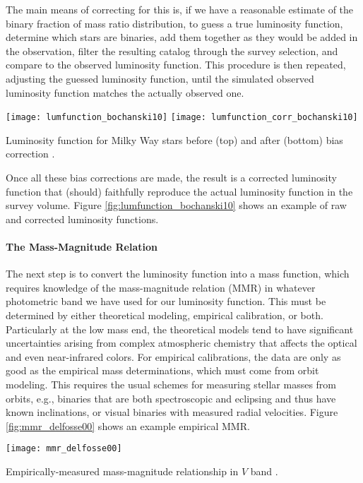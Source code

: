 The main means of correcting for this is, if we have a reasonable estimate of the binary fraction of mass ratio distribution, to guess a true luminosity function, determine which stars are binaries, add them together as they would be added in the observation, filter the resulting catalog through the survey selection, and compare to the observed luminosity function. This procedure is then repeated, adjusting the guessed luminosity function, until the simulated observed luminosity function matches the actually observed one. 

\begin{marginfigure}
\texttt{[image: lumfunction\_bochanski10]}
\texttt{[image: lumfunction\_corr\_bochanski10]}
\caption[Color-magnitude diagram of nearby stars]{
\label{fig:lumfunction_bochanski10}
Luminosity function for Milky Way stars before (top) and after (bottom) bias correction \citep{bochanski10a}.
}
\end{marginfigure}

Once all these bias corrections are made, the result is a corrected luminosity function that (should) faithfully reproduce the actual luminosity function in the survey volume. Figure \ref{fig:lumfunction_bochanski10} shows an example of raw and corrected luminosity functions.


\paragraph{The Mass-Magnitude Relation}

The next step is to convert the luminosity function into a mass function, which requires knowledge of the mass-magnitude relation (MMR) in whatever photometric band we have used for our luminosity function. This must be determined by either theoretical modeling, empirical calibration, or both. Particularly at the low mass end, the theoretical models tend to have significant uncertainties arising from complex atmospheric chemistry that affects the optical and even near-infrared colors. 
For empirical calibrations, the data are only as good as the empirical mass determinations, which must come from orbit modeling. This requires the usual schemes for measuring stellar masses from orbits, e.g., binaries that are both spectroscopic and eclipsing and thus have known inclinations, or visual binaries with measured radial velocities. Figure \ref{fig:mmr_delfosse00} shows an example empirical MMR.

\begin{marginfigure}
\texttt{[image: mmr\_delfosse00]}
\caption[Mass-magnitude relationship]{
\label{fig:mmr_delfosse00}
Empirically-measured mass-magnitude relationship in $V$ band \citep{delfosse00a}.
}
\end{marginfigure}

